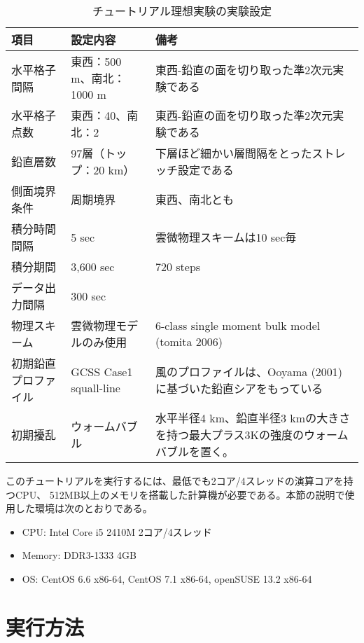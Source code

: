 \begin{table}[htb]
\begin{center}
\caption{チュートリアル理想実験の実験設定}
\begin{tabularx}{150mm}{|l|l|X|} \hline
 \rowcolor[gray]{0.9} 項目 & 設定内容 & 備考 \\ \hline
 水平格子間隔     & 東西：500 m、南北：1000 m    & 東西-鉛直の面を切り取った準2次元実験である \\ \hline
 水平格子点数     & 東西：40、南北：2 & 東西-鉛直の面を切り取った準2次元実験である \\ \hline
 鉛直層数         & 97層（トップ：20 km）& 下層ほど細かい層間隔をとったストレッチ設定である \\ \hline
 側面境界条件     & 周期境界 & 東西、南北とも \\ \hline
 積分時間間隔     & 5 sec                       & 雲微物理スキームは10 sec毎 \\ \hline
 積分期間         & 3,600 sec                   & 720 steps \\ \hline
 データ出力間隔   & 300 sec                      &  \\ \hline
 物理スキーム & 雲微物理モデルのみ使用 & 6-class single moment bulk model (tomita 2006) \\ \hline
 初期鉛直プロファイル & GCSS Case1 squall-line & 風のプロファイルは、Ooyama (2001)に基づいた鉛直シアをもっている \\ \hline
 初期擾乱 & ウォームバブル & 水平半径4 km、鉛直半径3 kmの大きさを持つ最大プラス3Kの強度のウォームバブルを置く。\\ \hline
\end{tabularx}
\label{tab:setting_ideal}
\end{center}
\end{table}

このチュートリアルを実行するには、最低でも2コア/4スレッドの演算コアを持つCPU、
512MB以上のメモリを搭載した計算機が必要である。本節の説明で使用した環境は次のとおりである。
\begin{itemize}
\item CPU: Intel Core i5 2410M 2コア/4スレッド
\item Memory: DDR3-1333 4GB
\item OS: CentOS 6.6 x86-64, CentOS 7.1 x86-64, openSUSE 13.2 x86-64
\end{itemize}


\section{実行方法}

